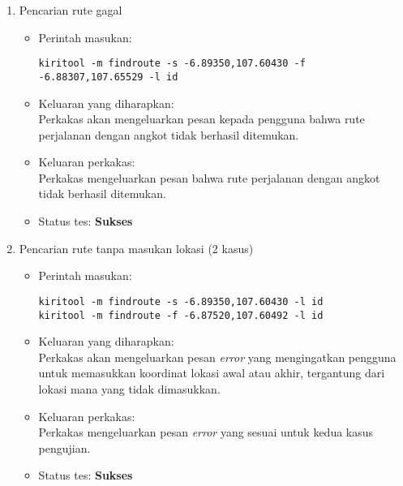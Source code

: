 \begin{enumerate}
	\item Pencarian rute gagal
	\begin{itemize}
		\item Perintah masukan:
		\begin{verbatim}
kiritool -m findroute -s -6.89350,107.60430 -f -6.88307,107.65529 -l id
		\end{verbatim}
		\item Keluaran yang diharapkan: \\
		Perkakas akan mengeluarkan pesan kepada pengguna bahwa rute perjalanan dengan angkot tidak berhasil ditemukan.
		\item Keluaran perkakas: \\
		Perkakas mengeluarkan pesan bahwa rute perjalanan dengan angkot tidak berhasil ditemukan.
		\item Status tes: \textbf{Sukses}
	\end{itemize}
	
	\item Pencarian rute tanpa masukan lokasi (2 kasus)
	\begin{itemize}
		\item Perintah masukan:
		\begin{verbatim}
kiritool -m findroute -s -6.89350,107.60430 -l id
kiritool -m findroute -f -6.87520,107.60492 -l id
		\end{verbatim}
		\item Keluaran yang diharapkan: \\
		Perkakas akan mengeluarkan pesan \textit{error} yang mengingatkan pengguna untuk memasukkan koordinat \latlon lokasi awal atau akhir, tergantung dari lokasi mana yang tidak dimasukkan.
		\item Keluaran perkakas: \\
		Perkakas  mengeluarkan pesan \textit{error} yang sesuai untuk kedua kasus pengujian.
		\item Status tes: \textbf{Sukses}
	\end{itemize}
	

\end{enumerate}
